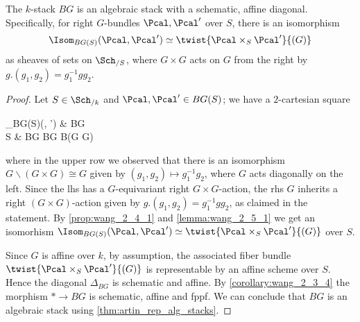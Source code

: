             \begin{lemma}
                \label{lemma:wang_2_5_2}
                The $k$-stack $BG$ is an algebraic stack with a schematic, affine diagonal. Specifically, for right $G$-bundles $\Pcal, \Pcal'$ over $S$, there is an isomorphism 
                \[\Isom_{BG(S)}(\Pcal, \Pcal') \simeq \twist{\Pcal \times_S \Pcal'}{(G)} \] as sheaves of sets on $\Sch_{/S}$, where $G \times G$ acts on $G$ from the right by $g.(g_1, g_2) = g_1^{-1}gg_2$.
            \end{lemma}
            \begin{proof}
                Let $S \in \Sch_{/k}$ and $\Pcal, \Pcal' \in BG(S)$; we have a $2$-cartesian square 
                \begin{diag}
                    \Isom_{BG(S)}(\Pcal, \Pcal') \ar[d] \ar[r] & BG \simeq {} \simeq {} \ar[d, "\Delta_{BG}"] \\
                    S  & BG \times BG \simeq B(G \times G)
                \end{diag}
                where in the upper row we observed that there is an isomorphism $G \backslash(G \times G) \cong G$ given by $(g_1, g_2) \mapsto g_1^{-1}g_2$, where $G$ acts diagonally on the left. Since the lhs has a $G$-equivariant right $G \times G$-action, the rhs $G$ inherits a right $(G \times G)$-action given by $g.(g_1, g_2) = g_1^{-1}gg_2$, as claimed in the statement. By \cref{prop:wang_2_4_1} and \cref{lemma:wang_2_5_1} we get an isomorhism $\Isom_{BG(S)}(\Pcal, \Pcal') \simeq \twist{\Pcal \times_S \Pcal'}{(G)}$ over $S$. 

                Since $G$ is affine over $k$, by assumption, the associated fiber bundle $\twist{\Pcal \times_S \Pcal'}{(G)}$ is representable by an affine scheme over $S$. Hence the diagonal $\Delta_{BG}$ is schematic and affine. By \cref{corollary:wang_2_3_4} the morphism $* \to BG$ is schematic, affine and fppf. We can conclude that $BG$ is an algebraic stack using \cref{thm:artin_rep_alg_stacks}.
            \end{proof}


